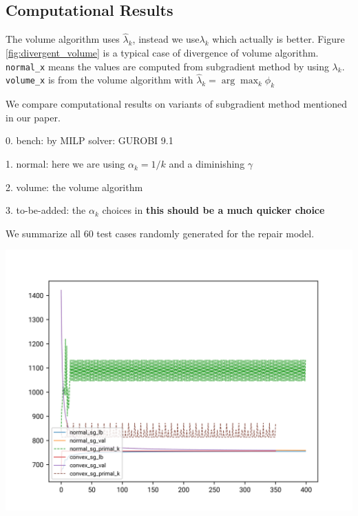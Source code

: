 \hypertarget{computational-results}{%
  \subsection{Computational Results}\label{computational-results}}



The volume algorithm uses \(\hat \lambda_{k}\), instead we use\(\lambda_{k}\) which actually is better.
Figure \ref{fig:divergent_volume} is a typical case of divergence of volume algorithm.
\texttt{normal\_x} means the values are computed from subgradient
method by using \(\lambda_{k}\). \texttt{volume\_x} is from the volume
algorithm with \(\hat \lambda_{k} = \arg\max_k \hat \phi_{k}\)

We compare computational results on variants of subgradient method mentioned in our paper.

0. bench: by MILP solver: GUROBI 9.1

1. normal: here we are using \(\alpha_k = 1/k\) and a diminishing \(\gamma\)

2. volume: the volume algorithm

3. to-be-added: the \(\alpha_k\) choices in \cite{brannlund1995generalized} \textbf{this should be a much quicker choice}

We summarize all \(60\) test cases randomly generated for the repair model.



\includegraphics{../imgs/conv_0_15_15.png}\label{fig:divergent_volume}


\hypertarget{refs}{}




